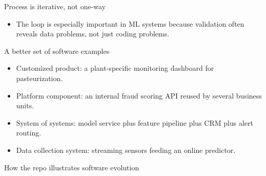 \begin{frame}{Process is iterative, not one-way}
\centering
{}
\vspace{0.5em}
\begin{itemize}
\item The loop is especially important in ML systems because validation often reveals data problems, not just coding problems.
\end{itemize}
\coursefooter
\end{frame}

\begin{frame}{A better set of software examples}
\begin{itemize}
\item Customized product: a plant-specific monitoring dashboard for pasteurization.
\item Platform component: an internal fraud scoring API reused by several business units.
\item System of systems: model service plus feature pipeline plus CRM plus alert routing.
\item Data collection system: streaming sensors feeding an online predictor.
\end{itemize}
\coursefooter
\end{frame}

\begin{frame}{How the repo illustrates software evolution}
\coursefooter
\end{frame}

